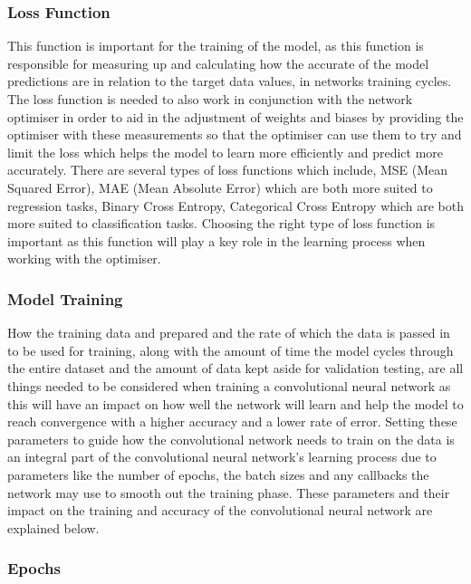 \documentclass[]{final_report}
\begin{document}
\subsubsection{Loss Function}

This function is important for the training of the model, as this function is responsible for measuring up and calculating how the accurate of the model predictions are in relation to the target data values, in networks training cycles. The loss function is needed to also work in conjunction with the network optimiser in order to aid in the adjustment of weights and biases by providing the optimiser with these measurements so that the optimiser can use them to try and limit the loss which helps the model to learn more efficiently and predict more accurately. There are several types of loss functions which include, MSE (Mean Squared Error), MAE (Mean Absolute Error) which are both more suited to regression tasks, Binary Cross Entropy, Categorical Cross Entropy which are both more suited to classification tasks. Choosing the right type of loss function is important as this function will play a key role in the learning process when working with the optimiser.\cite{Arxiv2025}

\subsubsection{Model Training}

How the training data and prepared and the rate of which the data is passed in to be used for training, along with the amount of time the model cycles through the entire dataset and the amount of data kept aside for validation testing, are all things needed to be considered when training a convolutional neural network as this will have an impact on how well the network will learn and help the model to reach convergence with a higher accuracy and a lower rate of error. Setting these parameters to guide how the convolutional network needs to train on the data is an integral part of the convolutional neural network’s learning process due to parameters like the number of epochs, the batch sizes and any callbacks the network may use to smooth out the training phase. These parameters and their impact on the training and accuracy of the convolutional neural network are explained below.

\subsubsection{Epochs}
\end{document}
